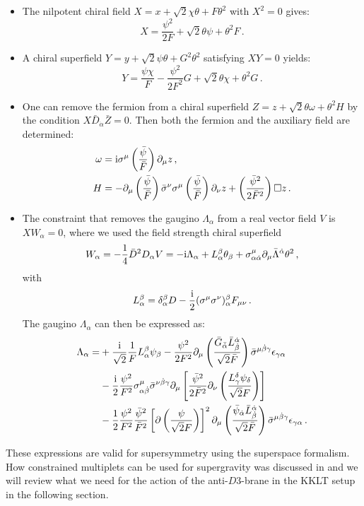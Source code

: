 \documentclass[12pt]{report}
\newcommand{\be}{\begin{equation}}
\newcommand{\ee}{\end{equation}}
\newcommand{\bea}{\begin{equation}\begin{aligned}}
\newcommand{\eea}{\end{aligned}\end{equation}}
\def\rmi{{\rm i}}
\begin{document}
\begin{itemize}
\item The nilpotent chiral field $X = x + \sqrt{2} \chi \theta + F \theta^2$ with $X^2=0$ gives:
\be 
X = \frac{\psi^2}{2F} + \sqrt{2}\theta \psi + \theta^2 F\,.
\ee
\item A chiral superfield $Y = y + \sqrt{2} \psi \theta + G^2 \theta^2$ satisfying $XY=0$ yields: 
\be
Y = \frac{\psi \chi}{F} - \frac{\psi^2}{2F^2} G + \sqrt{2}\theta \chi + \theta^2 G\,.
\ee
\item One can remove the fermion from a chiral superfield $Z = z + \sqrt{2} \theta \omega + \theta^2 H$ by the condition $X \bar{D}_{\dot{\alpha}} \bar{Z}=0$. Then both the fermion and the auxiliary field are determined:
\bea 
\omega &= \rmi \sigma^\mu \left(\frac{\bar{\psi}}{\bar{F}}\right) \partial_\mu z\,,\\
H &= -\partial_\mu \left(\frac{\bar{\psi}}{\bar{F}}\right) \bar{\sigma}^\nu \sigma^\mu \left(\frac{\bar{\psi}}{\bar{F}}\right) \partial_\nu z + \left(\frac{\bar{\psi}^2}{2\bar{F}^2}\right) \square z\,.
\eea
\item The constraint that removes the gaugino $\Lambda_\alpha$ from a real vector field $V$ is $X W_\alpha = 0$, where we used the field strength chiral superfield
\be 
W_\alpha = -\frac{1}{4} \bar{D}^2 D_\alpha V = - \rmi \Lambda_\alpha + L^\beta_\alpha \theta_\beta + \sigma^\mu_{\alpha\dot{\alpha}} \partial_\mu \bar{\Lambda}^{\dot{\alpha}} \theta^2\,,
\ee
with
\be 
L_\alpha^\beta = \delta^\beta_\alpha D - \frac{\rmi}{2} (\sigma^\mu \sigma^\nu)^\beta_\alpha F_{\mu\nu}\,.
\ee
The gaugino $\Lambda_\alpha$ can then be expressed as:
\bea
\Lambda_\alpha = & + \frac{\rmi}{\sqrt{2}}\frac{1}{F} L_\alpha^\beta \psi_\beta - \frac{\psi^2}{2F^2} \partial_\mu  \left( \frac{\bar{G}_{\bar{\dot{\alpha}}} \bar{L}^{\dot{\alpha}}_{\dot{\beta}}}{\sqrt{2} \bar{F}} \right) \bar{\sigma}^{\mu \dot{\beta}\gamma} \epsilon_{\gamma\alpha}\\
& - \frac{\rmi}{2} \frac{\psi^2}{F^2} \sigma^\mu_{\alpha \dot{\beta}} \bar{\sigma}^{\nu\dot{\beta}\gamma} \partial_\mu \left[ \frac{\bar{\psi}^2}{2 \bar{F}^2} \partial_\nu \left(\frac{L^\delta_\gamma \psi_\delta}{\sqrt{2} F}\right)\right]\\
& - \frac{1}{2} \frac{\psi^2}{F^2} \frac{\bar{\psi}^2}{\bar{F}^2} \left[\partial \left(\frac{\psi}{\sqrt{2}F}\right)\right]^2\partial_\mu \left(\frac{\bar{\psi}_{\dot{\alpha}} \bar{L}^{\dot{\alpha}}_{\dot{\beta}}}{\sqrt{2} \bar{F}}\right) \bar{\sigma}^{\mu\dot{\beta}\gamma} \epsilon_{\gamma \alpha}\,.
\eea
\end{itemize}
These expressions are valid for supersymmetry using the superspace formalism. How constrained multiplets can be used for supergravity was discussed in \cite{DallAgata:2015zxp} and we will review what we need for the action of the anti-$D3$-brane in the KKLT setup in the following section.
\end{document}
